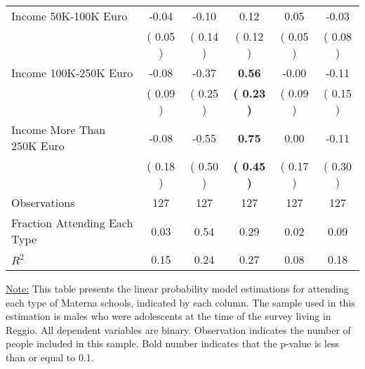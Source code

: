 \begin{table}[H]
{\begin{tabular}{lccccc}
\quad Income 50K-100K Euro &     -0.04 &     -0.10 &      0.12 &      0.05 &     -0.03 \\
\quad  & (     0.05 ) & (     0.14 )  & (     0.12 )  & (     0.05 ) & (     0.08 ) \\
\quad Income 100K-250K Euro &     -0.08 &     -0.37 & \textbf{     0.56} &     -0.00 &     -0.11 \\
\quad  & (     0.09 ) & (     0.25 )  & \textbf{(     0.23 )}  & (     0.09 ) & (     0.15 ) \\
\quad Income More Than 250K Euro &     -0.08 &     -0.55 & \textbf{     0.75} &      0.00 &     -0.11 \\
\quad  & (     0.18 ) & (     0.50 )  & \textbf{(     0.45 )}  & (     0.17 ) & (     0.30 ) \\
\midrule
Observations & 127 & 127 & 127 & 127 & 127 \\
Fraction Attending Each Type &      0.03 &      0.54 &      0.29 &      0.02 &      0.09 \\
\midrule
$ R^2$ &      0.15 &      0.24 &      0.27 &      0.08 &      0.18 \\
\bottomrule
\end{tabular}}
\end{table}
\begin{footnotesize}
\noindent\underline{Note:} This table presents the linear probability model estimations for attending each type of Materna schools, indicated by each column. The sample used in this estimation is males who were adolescents at the time of the survey living in Reggio. All dependent variables are binary. Observation indicates the number of people included in this sample. Bold number indicates that the p-value is less than or equal to 0.1.
\end{footnotesize}
